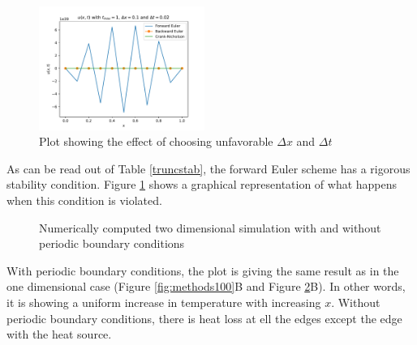 \documentclass[10pt,a4paper]{article}
\begin{document}
\begin{figure} [H]
	\centering
	\includegraphics[width=0.48\textwidth]{../plots/unstable.pdf}
	\caption{\label{fig:unstable} Plot showing the effect of choosing unfavorable $\Delta x$ and $\Delta t$}
\end{figure}

\noindent As can be read out of Table \ref{truncstab}, the forward Euler scheme has a rigorous stability condition. Figure \ref{fig:unstable} shows a graphical representation of what happens when this condition is violated. 

\begin{figure} [H]
	\centering
	\caption{\label{fig:5d} Numerically computed two dimensional simulation with and without periodic boundary conditions}
\end{figure}

\noindent With periodic boundary conditions, the plot is giving the same result as in the one dimensional case (Figure \ref{fig:methods100}B and Figure \ref{fig:5d}B). In other words, it is showing a uniform increase in temperature with increasing $x$. Without periodic boundary conditions, there is heat loss at ell the edges except the edge with the heat source. 
\end{document}
